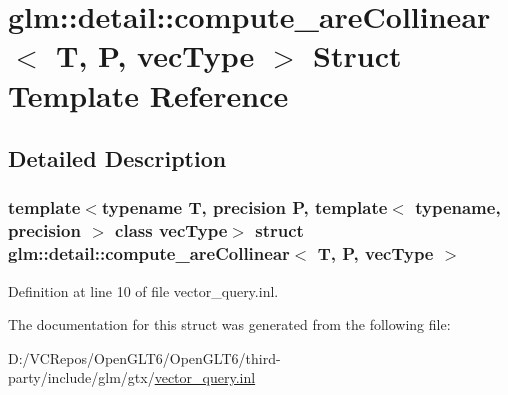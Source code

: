 \hypertarget{structglm_1_1detail_1_1compute__are_collinear}{}\section{glm\+::detail\+::compute\+\_\+are\+Collinear$<$ T, P, vec\+Type $>$ Struct Template Reference}
\label{structglm_1_1detail_1_1compute__are_collinear}


\subsection{Detailed Description}
\subsubsection*{template$<$typename T, precision P, template$<$ typename, precision $>$ class vec\+Type$>$\newline
struct glm\+::detail\+::compute\+\_\+are\+Collinear$<$ T, P, vec\+Type $>$}



Definition at line 10 of file vector\+\_\+query.\+inl.



The documentation for this struct was generated from the following file\+:\begin{DoxyCompactItemize}
\item 
D\+:/\+V\+C\+Repos/\+Open\+G\+L\+T6/\+Open\+G\+L\+T6/third-\/party/include/glm/gtx/\mbox{\hyperlink{vector__query_8inl}{vector\+\_\+query.\+inl}}\end{DoxyCompactItemize}
